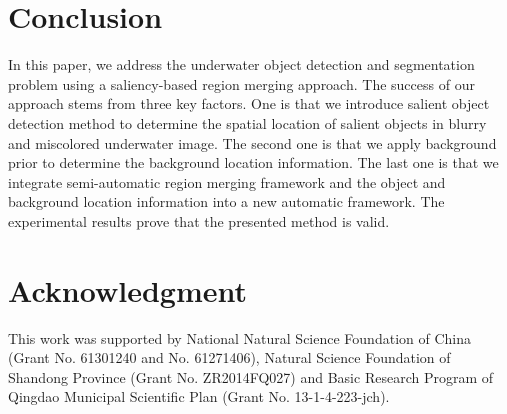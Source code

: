 \documentclass[conference]{IEEEtran}
\begin{document}

\section{Conclusion}
In this paper, we address the underwater object detection and segmentation problem using a saliency-based region merging approach. The success of our approach stems from three key factors. One is that we introduce salient object detection method to determine the spatial location of salient objects in blurry and miscolored underwater image. The second one is that we apply background prior to determine the background location information. The last one is that we integrate semi-automatic region merging framework and the object and background location information into a new automatic framework. The experimental results prove that the presented method is valid.




\section*{Acknowledgment}

This work was supported by National Natural Science Foundation of China (Grant No. 61301240 and No. 61271406), Natural Science Foundation of Shandong Province (Grant No. ZR2014FQ027) and Basic Research Program of Qingdao Municipal Scientific Plan (Grant No. 13-1-4-223-jch).







%
%
%
%
%




\end{document}
